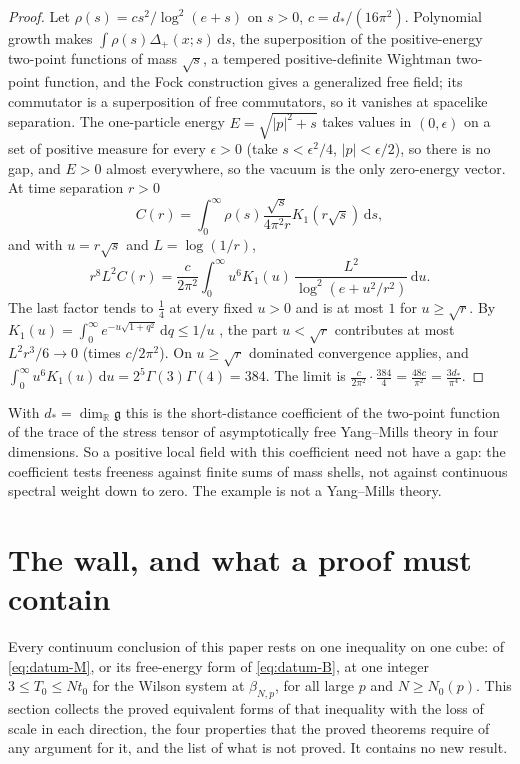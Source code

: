\documentclass[11pt,a4paper]{amsart}
\theoremstyle{definition}
\theoremstyle{remark}
\numberwithin{equation}{section}
\newcommand{\R}{\mathbb{R}}          %
\newcommand{\abs}[1]{\lvert #1\rvert}      %
\newcommand{\dd}{\,\mathrm{d}}             %
\newcommand{\Mcirc}{\text{\upshape(M$^{\circ}$)}}   %
\newcommand{\Bcirc}{\text{\upshape(B$^{\circ}$)}}   %
\newcommand{\tzero}{t_0}                   %
\newcommand{\Tzero}{T_0}                   %
\newcommand{\betaNp}{\beta_{N,p}}          %
\begin{document}
\begin{proof}
Let $\rho(s)=cs^2/\log^2(e+s)$ on $s>0$, $c=d_*/(16\pi^2)$. Polynomial growth makes $\int\rho(s)\Delta_+(x;s)\dd s$, the superposition of the positive-energy two-point functions of mass $\sqrt s$, a tempered positive-definite Wightman two-point function, and the Fock construction gives a generalized free field; its commutator is a superposition of free commutators, so it vanishes at spacelike separation. The one-particle energy $E=\sqrt{\abs p^2+s}$ takes values in $(0,\epsilon)$ on a set of positive measure for every $\epsilon>0$ (take $s<\epsilon^2/4$, $\abs p<\epsilon/2$), so there is no gap, and $E>0$ almost everywhere, so the vacuum is the only zero-energy vector. At time separation $r>0$
\[
C(r)=\int_0^\infty\rho(s)\frac{\sqrt s}{4\pi^2r}K_1(r\sqrt s)\dd s ,
\]
and with $u=r\sqrt s$ and $L=\log(1/r)$,
\[
r^8L^2C(r)=\frac{c}{2\pi^2}\int_0^\infty u^6K_1(u)\,\frac{L^2}{\log^2(e+u^2/r^2)}\dd u .
\]
The last factor tends to $\frac14$ at every fixed $u>0$ and is at most $1$ for $u\ge\sqrt r$. By $K_1(u)=\int_0^\infty e^{-u\sqrt{1+q^2}}\dd q\le1/u$ \cite[(10.32.9)]{dlmf}, the part $u<\sqrt r$ contributes at most $L^2r^3/6\to0$ (times $c/2\pi^2$). On $u\ge\sqrt r$ dominated convergence applies, and $\int_0^\infty u^6K_1(u)\dd u=2^5\Gamma(3)\Gamma(4)=384$. The limit is $\frac{c}{2\pi^2}\cdot\frac{384}{4}=\frac{48c}{\pi^2}=\frac{3d_*}{\pi^4}$.
\end{proof}

With $d_*=\dim_\R\mathfrak g$ this is the short-distance coefficient of the two-point function of the trace of the stress tensor of asymptotically free Yang--Mills theory in four dimensions. So a positive local field with this coefficient need not have a gap: the coefficient tests freeness against finite sums of mass shells, not against continuous spectral weight down to zero. The example is not a Yang--Mills theory.
\section{The wall, and what a proof must contain}\label{sec:wall}

\enlargethispage{2pt}Every continuum conclusion of this paper rests on one inequality on one cube: \Mcirc{} of \eqref{eq:datum-M}, or its free-energy form \Bcirc{} of \eqref{eq:datum-B}, at one integer $3\le\Tzero\le N\tzero$ for the Wilson system at $\betaNp$, for all large $p$ and $N\ge N_0(p)$. This section collects the proved equivalent forms of that inequality with the loss of scale in each direction, the four properties that the proved theorems require of any argument for it, and the list of what is not proved. It contains no new result.
\end{document}

